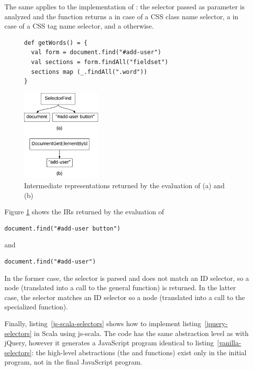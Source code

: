 \documentclass[preprint]{sigplanconf}
\begin{document}
The same applies to the implementation of : the selector passed as parameter is
analyzed and the function returns a  in case of a CSS class
name selector, a  in case of a CSS tag name selector, and a
 otherwise.

\begin{figure}
\begin{lstlisting}[label=js-scala-selectors,caption=Searching elements in js-scala]
def getWords() = {
  val form = document.find("#add-user")
  val sections = form.findAll("fieldset")
  sections map (_.findAll(".word"))
}
\end{lstlisting}
\end{figure}

\begin{figure}
\begin{center}
\includegraphics[width=4cm]{ir.pdf}
\end{center}
\caption{Intermediate representations returned by the evaluation of (a)
 and (b) }
\label{fig:ir}
\end{figure}

Figure \ref{fig:ir} shows the IRs returned by the evaluation of
\begin{lstlisting}[basicstyle=\small]
document.find("#add-user button")
\end{lstlisting}
and 
\begin{lstlisting}[basicstyle=\small]
document.find("#add-user")
\end{lstlisting}
In the former case, the selector is parsed and does not match an ID selector, so a
 node (translated into a call to the general  function) is
returned. In the latter case, the selector matches an ID selector so a
 node (translated into a call to the specialized 
function).

Finally, listing~\ref{js-scala-selectors} shows how to implement listing~\ref{jquery-selectors} in
Scala using js-scala. The code has the same abstraction level as with jQuery, however it
generates a JavaScript program identical to listing~\ref{vanilla-selectors}: the high-level
abstractions (the  and  functions) exist only in the initial program, not
in the final JavaScript program.
\end{document}
